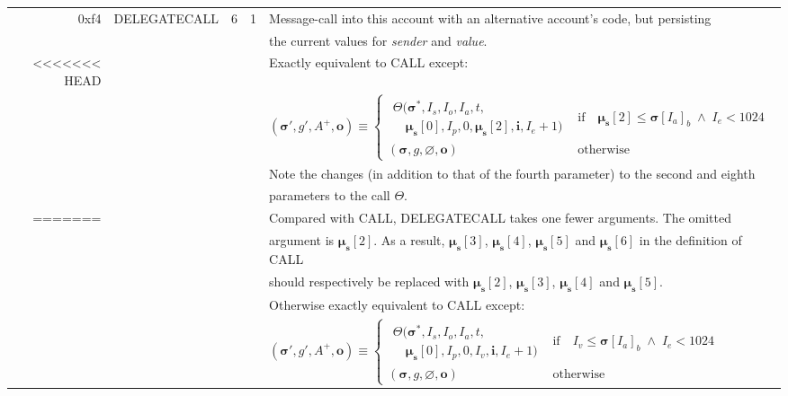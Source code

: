 \documentclass[9pt,oneside]{amsart}
\begin{document}
\begin{tabular*}{\columnwidth}[h]{rlrrl}
\midrule
0xf4 & {\small DELEGATECALL} & 6 & 1 & Message-call into this account with an alternative account's code, but persisting\\
&&&& the current values for {\it sender} and {\it value}. \\
<<<<<<< HEAD
&&&& Exactly equivalent to {\small CALL} except: \\
&&&& $(\boldsymbol{\sigma}', g', A^+, \mathbf{o}) \equiv \begin{cases}\begin{array}{l}\Theta(\boldsymbol{\sigma}^*, I_s, I_o, I_a, t,\\\quad \boldsymbol{\mu}_\mathbf{s}[0], I_p, 0, \boldsymbol{\mu}_\mathbf{s}[2], \mathbf{i}, I_e + 1)\end{array} & \text{if} \quad \boldsymbol{\mu}_\mathbf{s}[2] \leqslant \boldsymbol{\sigma}[I_a]_b \;\wedge\; I_e < 1024 \\ (\boldsymbol{\sigma}, g, \varnothing, \mathbf{o}) & \text{otherwise} \end{cases}$ \\
&&&& Note the changes (in addition to that of the fourth parameter) to the second and eighth\\
&&&& parameters to the call $\Theta$.\\
=======
&&&& Compared with {\small CALL}, {\small DELEGATECALL} takes one fewer arguments.  The omitted\\
&&&& argument is $\boldsymbol{\mu}_\mathbf{s}[2]$. As a result, $\boldsymbol{\mu}_\mathbf{s}[3]$, $\boldsymbol{\mu}_\mathbf{s}[4]$, $\boldsymbol{\mu}_\mathbf{s}[5]$ and $\boldsymbol{\mu}_\mathbf{s}[6]$ in the definition of {\small CALL} \\
&&&& should respectively be replaced with $\boldsymbol{\mu}_\mathbf{s}[2]$, $\boldsymbol{\mu}_\mathbf{s}[3]$, $\boldsymbol{\mu}_\mathbf{s}[4]$ and $\boldsymbol{\mu}_\mathbf{s}[5]$. \\
&&&& Otherwise exactly equivalent to {\small CALL} except: \\
&&&& $(\boldsymbol{\sigma}', g', A^+, \mathbf{o}) \equiv \begin{cases}\begin{array}{l}\Theta(\boldsymbol{\sigma}^*, I_s, I_o, I_a, t,\\\quad \boldsymbol{\mu}_\mathbf{s}[0], I_p, 0, I_v, \mathbf{i}, I_e + 1)\end{array} & \text{if} \quad I_v \leqslant \boldsymbol{\sigma}[I_a]_b \;\wedge\; I_e < 1024 \\ (\boldsymbol{\sigma}, g, \varnothing, \mathbf{o}) & \text{otherwise} \end{cases}$ \\

\end{tabular*}
\end{document}
